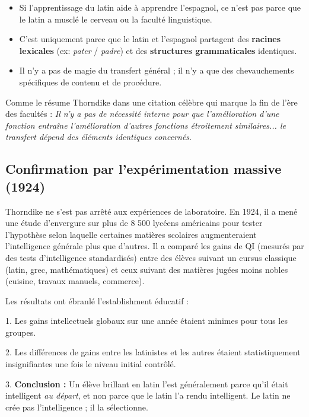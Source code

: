 \begin{itemize}\item Si l'apprentissage du latin aide à apprendre l'espagnol, ce n'est pas parce que le latin a \og musclé\fg{} le cerveau ou la \og faculté linguistique\fg{}.\item C'est uniquement parce que le latin et l'espagnol partagent des \textbf{racines lexicales} (ex: \textit{pater} / \textit{padre}) et des \textbf{structures grammaticales} identiques.\item Il n'y a pas de \og magie\fg{} du transfert général ; il n'y a que des chevauchements spécifiques de contenu et de procédure.\end{itemize}Comme le résume Thorndike dans une citation célèbre qui marque la fin de l'ère des facultés :
\textit{\og Il n'y a pas de nécessité interne pour que l'amélioration d'une fonction entraîne
l'amélioration d'autres fonctions étroitement similaires... le transfert dépend des éléments
identiques concernés\fg{}}.\cite{II-1-1-ref15}



\subsection{Confirmation par l'expérimentation massive (1924)}

Thorndike ne s'est pas arrêté aux expériences de laboratoire. En 1924, il a mené une étude
d'envergure sur plus de 8 500 lycéens américains pour tester l'hypothèse selon laquelle certaines
matières scolaires augmenteraient l'intelligence générale plus que d'autres. Il a comparé les gains
de QI (mesurés par des tests d'intelligence standardisés) entre des élèves suivant un cursus
classique (latin, grec, mathématiques) et ceux suivant des matières jugées \og moins nobles\fg{}
(cuisine, travaux manuels, commerce).

Les résultats ont ébranlé l'establishment éducatif :

1. Les gains intellectuels globaux sur une année étaient minimes pour tous les groupes.

2. Les différences de gains entre les latinistes et les autres étaient statistiquement
insignifiantes une fois le niveau initial contrôlé.

3. \textbf{Conclusion :} Un élève brillant en latin l'est généralement parce qu'il était intelligent
\textit{au départ}, et non parce que le latin l'a rendu intelligent. Le latin ne crée pas
l'intelligence ; il la sélectionne.\cite{II-1-1-ref16}

